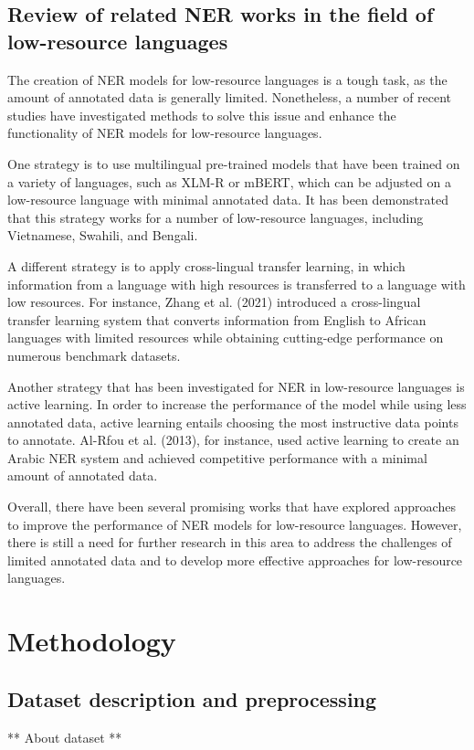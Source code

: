 \documentclass[a4paper,12pt]{report}
\begin{document}
\section{Review of related NER works in the field of low-resource languages}
The creation of NER models for low-resource languages is a tough task, as the amount of annotated data is generally limited. Nonetheless, a number of recent studies have investigated methods to solve this issue and enhance the functionality of NER models for low-resource languages.
\par
One strategy is to use multilingual pre-trained models that have been trained on a variety of languages, such as XLM-R or mBERT, which can be adjusted on a low-resource language with minimal annotated data. It has been demonstrated that this strategy works for a number of low-resource languages, including Vietnamese, Swahili, and Bengali.
\par
A different strategy is to apply cross-lingual transfer learning, in which information from a language with high resources is transferred to a language with low resources. For instance, Zhang et al. (2021) introduced a cross-lingual transfer learning system that converts information from English to African languages with limited resources while obtaining cutting-edge performance on numerous benchmark datasets.
\par
Another strategy that has been investigated for NER in low-resource languages is active learning. In order to increase the performance of the model while using less annotated data, active learning entails choosing the most instructive data points to annotate. Al-Rfou et al. (2013), for instance, used active learning to create an Arabic NER system and achieved competitive performance with a minimal amount of annotated data.
\par
Overall, there have been several promising works that have explored approaches to improve the performance of NER models for low-resource languages. However, there is still a need for further research in this area to address the challenges of limited annotated data and to develop more effective approaches for low-resource languages.

\chapter{Methodology}\label{cap:methodology}
\section{Dataset description and preprocessing}
** About dataset **
\end{document}
